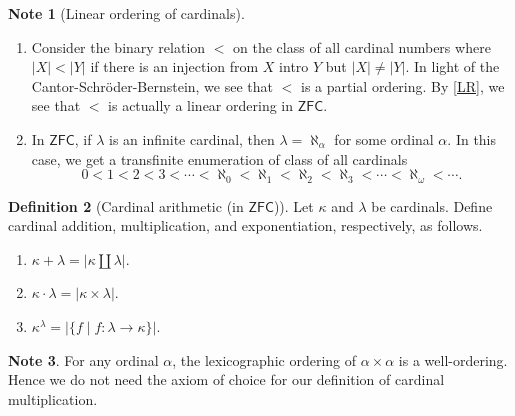 \documentclass[10pt,letterpaper,cm]{nupset}
\theoremstyle{definition}
\newtheorem{definition}{Definition}[subsection]
\newtheorem{note}[definition]{Note}
\theoremstyle{theorem}
\theoremstyle{remark}
\newcommand{\1}{\mathbf{1}}
\newcommand{\0}{\vec 0}
\newcommand{\zfc}{\mathsf{ZFC}}
\begin{document}
\begin{note}[Linear ordering of cardinals]
\begin{enumerate}
\item Consider the binary relation $< $ on the class of all cardinal numbers where $\left\lvert{X}\right\rvert < \left\lvert{Y}\right\rvert$ if there is an injection from $X$ intro $Y$ but $\left\lvert{X}\right\rvert \ne \left\lvert{Y}\right\rvert$. In light of the Cantor-Schr\"oder-Bernstein, we see that $<$ is a partial ordering. By \cref{LR}, we see that $<$ is actually a linear ordering in $\zfc$. 
\item In $\zfc$, if $\lambda$ is an infinite cardinal, then $\lambda = \aleph_{\alpha}$ for some ordinal $\alpha$. In this case, we get a transfinite enumeration of class of all cardinals
\[
0 < 1 < 2 < 3 < \cdots < \aleph_0 < \aleph_1 < \aleph_2 < \aleph_3 <  \cdots < \aleph_{\omega} < \cdots
.\]
\end{enumerate}
\end{note}

\begin{definition}[Cardinal arithmetic (in $\zfc$)] Let $\kappa$ and $\lambda$ be cardinals. Define cardinal addition, multiplication, and exponentiation, respectively, as follows.
\begin{enumerate}
\item $\kappa + \lambda = \left\lvert{\kappa \coprod \lambda}\right\rvert$.
\item $\kappa \cdot \lambda = \left\lvert{\kappa \times \lambda}\right\rvert $.
\item $\kappa^{\lambda} = \left\lvert{\{f \mid f : \lambda \to \kappa \}}\right\rvert$.
\end{enumerate} 
\end{definition}

\begin{note}
For any ordinal $\alpha$,  the lexicographic ordering of $\alpha \times \alpha$ is a well-ordering. Hence we do not need the axiom of choice for our definition of cardinal multiplication. 
\end{note}
\end{document}
